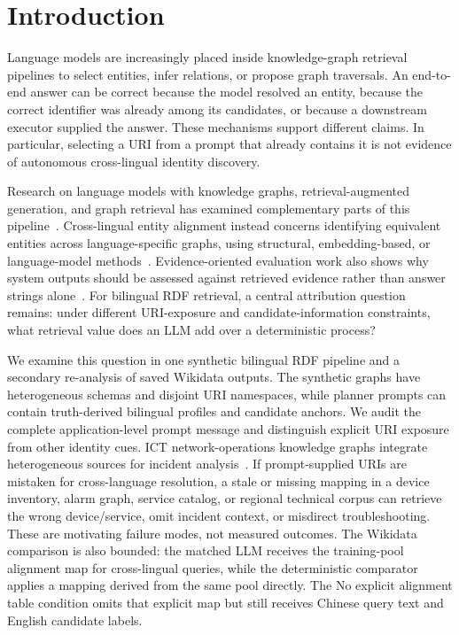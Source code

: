 \documentclass[a4paper,fleqn]{cas-dc}
\begin{document}
\section{Introduction}\label{sec:intro}
Language models are increasingly placed inside knowledge-graph retrieval pipelines to select entities, infer relations, or propose graph traversals. An end-to-end answer can be correct because the model resolved an entity, because the correct identifier was already among its candidates, or because a downstream executor supplied the answer. These mechanisms support different claims. In particular, selecting a URI from a prompt that already contains it is not evidence of autonomous cross-lingual identity discovery.

Research on language models with knowledge graphs, retrieval-augmented generation, and graph retrieval has examined complementary parts of this pipeline~\cite{pan2024unifying,ibrahim2024kgllm,lewis2020rag,edge2024graphrag,gao2024rag}. Cross-lingual entity alignment instead concerns identifying equivalent entities across language-specific graphs, using structural, embedding-based, or language-model methods~\cite{sun2018jape,zeng2021alignment,yang2024segalign}. Evidence-oriented evaluation work also shows why system outputs should be assessed against retrieved evidence rather than answer strings alone~\cite{thorne2018fever,beir2021}. For bilingual RDF retrieval, a central attribution question remains: under different URI-exposure and candidate-information constraints, what retrieval value does an LLM add over a deterministic process?

We examine this question in one synthetic bilingual RDF pipeline and a secondary re-analysis of saved Wikidata outputs. The synthetic graphs have heterogeneous schemas and disjoint URI namespaces, while planner prompts can contain truth-derived bilingual profiles and candidate anchors. We audit the complete application-level prompt message and distinguish explicit URI exposure from other identity cues. ICT network-operations knowledge graphs integrate heterogeneous sources for incident analysis~\cite{tailhardat2024noriaui}. If prompt-supplied URIs are mistaken for cross-language resolution, a stale or missing mapping in a device inventory, alarm graph, service catalog, or regional technical corpus can retrieve the wrong device/service, omit incident context, or misdirect troubleshooting. These are motivating failure modes, not measured outcomes. The Wikidata comparison is also bounded: the matched LLM receives the training-pool alignment map for cross-lingual queries, while the deterministic comparator applies a mapping derived from the same pool directly. The No explicit alignment table condition omits that explicit map but still receives Chinese query text and English candidate labels.
\end{document}
